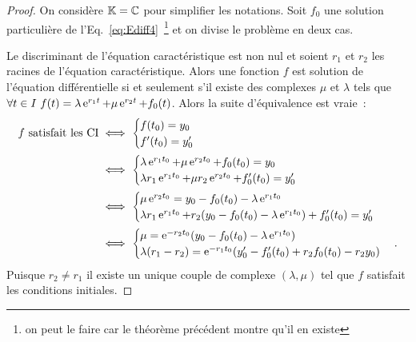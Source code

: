 \begin{proof}
On considère $\mathbb{K}=\mathbb{C}$ pour simplifier les notations. Soit $f_0$ une solution particulière de l'Eq.~\eqref{eq:Ediff4}~\footnote{on peut le faire car le théorème précédent montre qu'il en existe} et on divise le problème en deux cas.

Le discriminant de l'équation caractéristique est non nul et soient $r_1$ et $r_2$ les racines de l'équation caractéristique. Alors une fonction $f$ est solution de l'équation différentielle si et seulement s'il existe des complexes $\mu$ et $\lambda$ tels que $\forall t \in I \ f(t)=\lambda \operatorname{e}^{r_1 t}+ \mu \operatorname{e}^{r_2 t} + f_0(t)$. Alors la suite d'équivalence est vraie~:
  \begin{align}
    f \text{~satisfait les CI} &\iff  \begin{cases}f(t_0)=y_0 \\ f'(t_0)=y'_0 \end{cases}\\
    &\iff  \begin{cases}\lambda \operatorname{e}^{r_1 t_0}+ \mu \operatorname{e}^{r_2 t_0} + f_0(t_0)=y_0 \\ \lambda r_1 \operatorname{e}^{r_1 t_0}+ \mu r_2 \operatorname{e}^{r_2 t_0} + f_0'(t_0)=y'_0 \end{cases}\\ 
    &\iff  \begin{cases}\mu\operatorname{e}^{r_2t_0}=y_0-f_0(t_0)-\lambda \operatorname{e}^{r_1t_0} \\ \lambda r_1 \operatorname{e}^{r_1t_0}+r_2(y_0-f_0(t_0)-\lambda\operatorname{e}^{r_1t_0})+f'_0(t_0)=y'_0 \end{cases}\\ 
    &\iff \begin{cases} \mu=\operatorname{e}^{-r_2t_0}(y_0-f_0(t_0)-\lambda \operatorname{e}^{r_1t_0}) \\ \lambda(r_1-r_2)=\operatorname{e}^{-r_1t_0}(y'_0-f'_0(t_0)+r_2f_0(t_0)-r_2y_0)\end{cases}.
  \end{align}
Puisque $r_2 \neq r_1$ il existe un unique couple de complexe $(\lambda, \mu)$ tel que $f$ satisfait les conditions initiales.


\end{proof}
